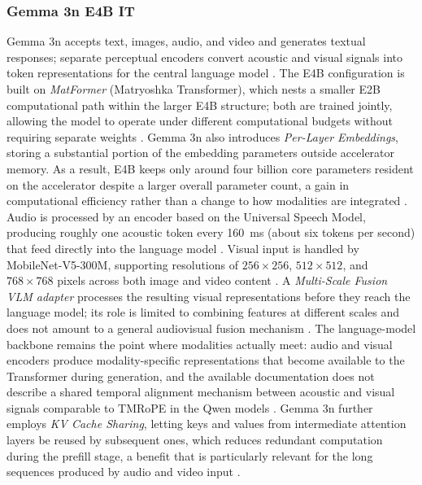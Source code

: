 \subsubsection*{Gemma 3n E4B IT}
Gemma 3n accepts text, images, audio, and video and generates textual responses; separate perceptual encoders convert acoustic and visual signals into token representations for the central language model \cite{gemma3n2025}.
The E4B configuration is built on \textit{MatFormer} (Matryoshka Transformer), which nests a smaller E2B computational path within the larger E4B structure; both are trained jointly, allowing the model to operate under different computational budgets without requiring separate weights \cite{gemma3n2025}.
Gemma 3n also introduces \textit{Per-Layer Embeddings}, storing a substantial portion of the embedding parameters outside accelerator memory. As a result, E4B keeps only around four billion core parameters resident on the accelerator despite a larger overall parameter count, a gain in computational efficiency rather than a change to how modalities are integrated \cite{gemma3n2025}.
Audio is processed by an encoder based on the Universal Speech Model, producing roughly one acoustic token every 160~ms (about six tokens per second) that feed directly into the language model \cite{gemma3n2025}. Visual input is handled by MobileNet-V5-300M, supporting resolutions of $256 \times 256$, $512 \times 512$, and $768 \times 768$ pixels across both image and video content \cite{gemma3n2025}. A \textit{Multi-Scale Fusion VLM adapter} processes the resulting visual representations before they reach the language model; its role is limited to combining features at different scales and does not amount to a general audiovisual fusion mechanism \cite{gemma3n2025}.
The language-model backbone remains the point where modalities actually meet: audio and visual encoders produce modality-specific representations that become available to the Transformer during generation, and the available documentation does not describe a shared temporal alignment mechanism between acoustic and visual signals comparable to TMRoPE in the Qwen models \cite{gemma3n2025}.
Gemma 3n further employs \textit{KV Cache Sharing}, letting keys and values from intermediate attention layers be reused by subsequent ones, which reduces redundant computation during the prefill stage, a benefit that is particularly relevant for the long sequences produced by audio and video input \cite{gemma3n2025}.
